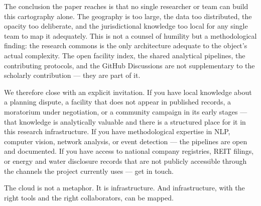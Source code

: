 The conclusion the paper reaches is that no single researcher or team can build this cartography alone. The geography is too large, the data too distributed, the opacity too deliberate, and the jurisdictional knowledge too local for any single team to map it adequately. This is not a counsel of humility but a methodological finding: the research commons is the only architecture adequate to the object's actual complexity. The open facility index, the shared analytical pipelines, the contributing protocols, and the GitHub Discussions are not supplementary to the scholarly contribution — they are part of it.

We therefore close with an explicit invitation. If you have local knowledge about a planning dispute, a facility that does not appear in published records, a moratorium under negotiation, or a community campaign in its early stages — that knowledge is analytically valuable and there is a structured place for it in this research infrastructure. If you have methodological expertise in NLP, computer vision, network analysis, or event detection — the pipelines are open and documented. If you have access to national company registries, REIT filings, or energy and water disclosure records that are not publicly accessible through the channels the project currently uses — get in touch.

The cloud is not a metaphor. It is infrastructure. And infrastructure, with the right tools and the right collaborators, can be mapped.
